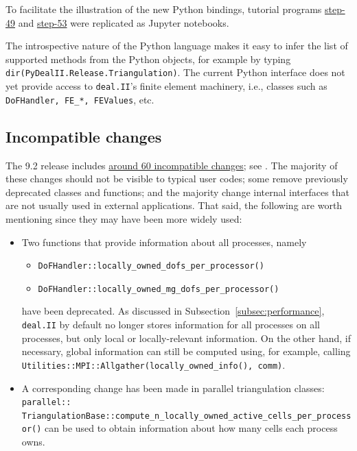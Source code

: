 \documentclass{ansarticle-preprint}
\newcommand{\specialword}[1]{\texttt{#1}}
\newcommand{\dealii}{{\specialword{deal.II}}\xspace}
\begin{document}
To facilitate the illustration of the new Python bindings, tutorial programs \href{https://github.com/dealii/dealii/blob/dealii-9.2/examples/step-49/step-49.ipynb}{step-49} and \href{https://github.com/dealii/dealii/blob/dealii-9.2/examples/step-53/step-53.ipynb}{step-53} were replicated as Jupyter notebooks.

The introspective nature of the Python language makes it easy to infer
the list of supported methods from the Python objects, for example by
typing \texttt{dir(PyDealII.Release.Triangulation)}.
The current Python interface does not yet provide access to \dealii{}'s finite element machinery, i.e., classes such as \texttt{DoFHandler, FE\_*, FEValues}, etc.

\subsection{Incompatible changes}

The 9.2 release includes
\href{https://dealii.org/developer/doxygen/deal.II/changes_between_9_1_1_and_9_2_0.html}
{around 60 incompatible changes}; see \cite{changes92}. The majority of these changes
should not be visible to typical user codes; some remove previously
deprecated classes and functions; and the majority change internal
interfaces that are not usually used in external
applications. That said, the following are worth mentioning since they
may have been more widely used:
\begin{itemize}
  \item Two functions that provide information about all processes,
        namely
        \begin{itemize}
          \item \texttt{DoFHandler::locally\_owned\_dofs\_per\_processor()}
          \item \texttt{DoFHandler::locally\_owned\_mg\_dofs\_per\_processor()}
        \end{itemize}
        have been deprecated. As discussed in
        Subsection~\ref{subsec:performance}, \dealii{} by default no longer
        stores information for all processes on all processes, but only
        local or locally-relevant information. On the other
        hand, if necessary, global information can still be computed using,
        for example, calling
        \texttt{Utilities::MPI::Allgather(locally\_owned\_info(), comm)}.

  \item A corresponding change has been made in parallel triangulation
        classes:
        \texttt{parallel::} \texttt{TriangulationBase::compute\_n\_locally\_owned\_active\_cells\_per\_processor()}
        can be used to obtain information about how many cells each
        process owns.
\end{itemize}
\end{document}
